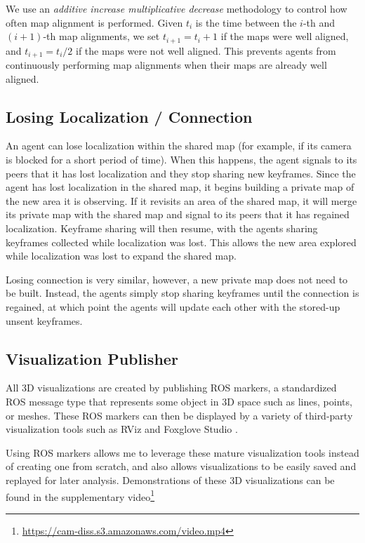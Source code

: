 We use an \textit{additive increase multiplicative decrease} methodology to control how often map alignment is performed. Given $t_i$ is the time between the $i$-th and $(i+1)$-th map alignments, we set $t_{i+1} = t_i + 1$ if the maps were well aligned, and $t_{i+1} = t_i / 2$ if the maps were not well aligned. This prevents agents from continuously performing map alignments when their maps are already well aligned.

\subsection{Losing Localization / Connection}
\label{sec:losing-localization-or-connection}
An agent can lose localization within the shared map (for example, if its camera is blocked for a short period of time). When this happens, the agent signals to its peers that it has lost localization and they stop sharing new keyframes. Since the agent has lost localization in the shared map, it begins building a private map of the new area it is observing. If it revisits an area of the shared map, it will merge its private map with the shared map and signal to its peers that it has regained localization. Keyframe sharing will then resume, with the agents sharing keyframes collected while localization was lost. This allows the new area explored while localization was lost to expand the shared map.

Losing connection is very similar, however, a new private map does not need to be built. Instead, the agents simply stop sharing keyframes until the connection is regained, at which point the agents will update each other with the stored-up unsent keyframes.

\subsection{Visualization Publisher}
\label{sec:visualization-publisher}
All 3D visualizations are created by publishing ROS markers, a standardized ROS message type that represents some object in 3D space such as lines, points, or meshes. These ROS markers can then be displayed by a variety of third-party visualization tools such as RViz \autocite{10.1007/s11235-015-0034-5} and Foxglove Studio \autocite{foxgloveStudio}.

Using ROS markers allows me to leverage these mature visualization tools instead of creating one from scratch, and also allows visualizations to be easily saved and replayed for later analysis. Demonstrations of these 3D visualizations can be found in the supplementary video\footnote[1]{\url{https://cam-diss.s3.amazonaws.com/video.mp4}}

